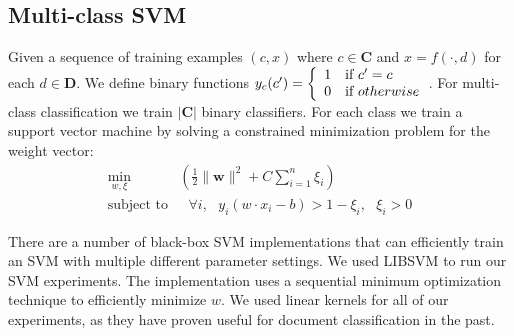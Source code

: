 
\subsection{Multi-class SVM} %
\label{sub:multiclass_svm}

Given a sequence of training examples $(c, x)$ where $c \in \mathbf{C}$ and $x = f(\cdot, d)$ for each $d \in \mathbf{D}$. We define binary functions $y_c(c
') = \left\{ \begin{array}{ll} 1 & \mbox{if }  c' = c \\ 0 & \mbox{if } otherwise \end{array} \right.$. For multi-class classification we train $| \mathbf{C} |$ binary classifiers. For each class we train a support vector machine by solving a constrained minimization problem for the weight vector:
\begin{align*}
	\min_{w,\xi} & \left( \frac{1}{2} \| \mathbf{w} \|^2 + C \sum_{i=1}^n \xi_i \right) \\
	\text{subject to} &  \text{ } \forall i, \text{ } y_i(w \cdot x_i - b) > 1 - \xi_i, \text{ } \xi_i > 0
\end{align*}

There are a number of black-box SVM implementations that can efficiently train an SVM with multiple different parameter settings. We used LIBSVM\cite{CC01a} to run our SVM experiments. The implementation uses a sequential minimum optimization technique\cite{Fan05workingset} to efficiently minimize $w$. We used linear kernels for all of our experiments, as they have proven useful for document classification in the past\cite{DBLP:conf/ecml/Joachims98}.










